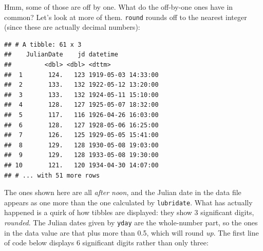 \documentclass[]{tufte-book}
\newenvironment{Shaded}{}{}
\newcommand{\DataTypeTok}[1]{\textcolor[rgb]{0.56,0.13,0.00}{#1}}
\newcommand{\DecValTok}[1]{\textcolor[rgb]{0.25,0.63,0.44}{#1}}
\newcommand{\KeywordTok}[1]{\textcolor[rgb]{0.00,0.44,0.13}{\textbf{#1}}}
\newcommand{\NormalTok}[1]{#1}
\newcommand{\OperatorTok}[1]{\textcolor[rgb]{0.40,0.40,0.40}{#1}}
\newcommand{\StringTok}[1]{\textcolor[rgb]{0.25,0.44,0.63}{#1}}
\theoremstyle{definition}
\theoremstyle{definition}
\theoremstyle{definition}
\theoremstyle{remark}
\begin{document}
Hmm, some of those are off by one. What do the off-by-one ones have in
common? Let's look at more of them. \texttt{round} rounds off to the
nearest integer (since these are actually decimal numbers):

\begin{Shaded}
\end{Shaded}

\begin{verbatim}
## # A tibble: 61 x 3
##    JulianDate    jd datetime           
##         <dbl> <dbl> <dttm>             
##  1       124.   123 1919-05-03 14:33:00
##  2       133.   132 1922-05-12 13:20:00
##  3       133.   132 1924-05-11 15:10:00
##  4       128.   127 1925-05-07 18:32:00
##  5       117.   116 1926-04-26 16:03:00
##  6       128.   127 1928-05-06 16:25:00
##  7       126.   125 1929-05-05 15:41:00
##  8       129.   128 1930-05-08 19:03:00
##  9       129.   128 1933-05-08 19:30:00
## 10       121.   120 1934-04-30 14:07:00
## # ... with 51 more rows
\end{verbatim}

The ones shown here are all \emph{after noon}, and the Julian date in
the data file appears as one more than the one calculated by
\texttt{lubridate}. What has actually happened is a quirk of how tibbles
are displayed: they show 3 significant digits, \emph{rounded}. The
Julian dates given by \texttt{yday} are the whole-number part, so the
ones in the data value are that plus more than 0.5, which will round
\emph{up}. The first line of code below displays 6 significant digits
rather than only three:

\begin{Shaded}
\end{Shaded}
\end{document}
